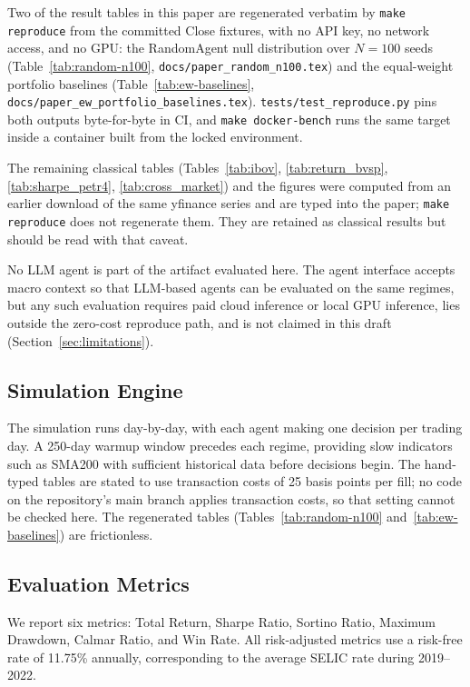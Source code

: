 \documentclass{article}
\begin{document}
Two of the result tables in this paper are regenerated verbatim by
\texttt{make reproduce} from the committed Close fixtures, with no
API key, no network access, and no GPU: the RandomAgent null
distribution over $N{=}100$ seeds (Table~\ref{tab:random-n100},
\texttt{docs/paper\_random\_n100.tex}) and the equal-weight
portfolio baselines (Table~\ref{tab:ew-baselines},
\texttt{docs/paper\_ew\_portfolio\_baselines.tex}).
\texttt{tests/test\_reproduce.py} pins both outputs byte-for-byte in
CI, and \texttt{make docker-bench} runs the same target inside a
container built from the locked environment.

The remaining classical tables (Tables~\ref{tab:ibov},
\ref{tab:return_bvsp}, \ref{tab:sharpe_petr4}, \ref{tab:cross_market})
and the figures were computed from an earlier download of the same
yfinance series and are typed into the paper; \texttt{make reproduce}
does not regenerate them. They are retained as classical results but
should be read with that caveat.

No LLM agent is part of the artifact evaluated here. The agent
interface accepts macro context so that LLM-based agents can be
evaluated on the same regimes, but any such evaluation requires paid
cloud inference or local GPU inference, lies outside the zero-cost
reproduce path, and is not claimed in this draft
(Section~\ref{sec:limitations}).

\subsection{Simulation Engine}

The simulation runs day-by-day, with each agent making one decision per
trading day. A 250-day warmup window precedes each regime, providing
slow indicators such as SMA200 with sufficient historical data before
decisions begin. The hand-typed tables are stated to use transaction
costs of 25 basis points per fill; no code on the repository's main
branch applies transaction costs, so that setting cannot be checked
here. The regenerated tables (Tables~\ref{tab:random-n100}
and~\ref{tab:ew-baselines}) are frictionless.

\subsection{Evaluation Metrics}

We report six metrics: Total Return, Sharpe Ratio, Sortino Ratio,
Maximum Drawdown, Calmar Ratio, and Win Rate. All risk-adjusted metrics
use a risk-free rate of 11.75\% annually, corresponding to the average
SELIC rate during 2019--2022.
\end{document}
